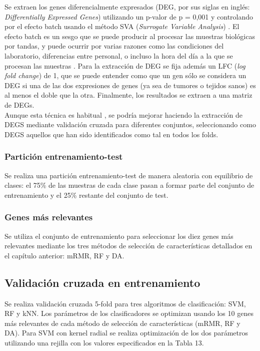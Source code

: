 Se extraen los genes diferencialmente expresados (DEG, por sus siglas en inglés: \textit{Differentially Expressed Genes}) utilizando un p-valor de p = 0,001 y controlando por el efecto batch usando el método SVA (\textit{Surrogate Variable Analysis}) \cite{Leek2012}. El efecto batch es un sesgo que se puede producir al procesar las muestras biológicas por tandas, y puede ocurrir por varias razones como las condiciones del laboratorio, diferencias entre personal, o incluso la hora del día a la que se procesan las muestras \cite{Goh2017, Leek2010}. Para la extracción de DEG se fija además un LFC (\textit{log fold change}) de 1, que se puede entender como que un gen sólo se considera un DEG si una de las dos expresiones de genes (ya sea de tumores o tejidos sanos) es al menos el doble que la otra. Finalmente, los resultados se extraen a una matriz de DEGs.\\

Aunque esta técnica es habitual \cite{Lee2020}, se podría mejorar haciendo la extracción de DEGS mediante validación cruzada para diferentes conjuntos, seleccionando como DEGS aquellos que han sido identificados como tal en todos los folds.

\subsubsection{Partición entrenamiento-test}

Se realiza una partición entrenamiento-test de manera aleatoria con equilibrio de clases: el 75\% de las muestras de cada clase pasan a formar parte del conjunto de entrenamiento y el 25\% restante del conjunto de test.

\subsubsection{Genes más relevantes}

Se utiliza el conjunto de entrenamiento para seleccionar los diez genes más relevantes mediante los tres métodos de selección de características detallados en el capítulo anterior: mRMR, RF y DA.

\subsection{Validación cruzada en entrenamiento}

Se realiza validación cruzada 5-fold para tres algoritmos de clasificación: SVM, RF y kNN. Los parámetros de los clasificadores se optimizan usando los 10 genes más relevantes de cada método de selección de características (mRMR, RF y DA). Para SVM con kernel radial se realiza optimización de los dos parámetros utilizando una rejilla con los valores especificados en la Tabla 13.\\

